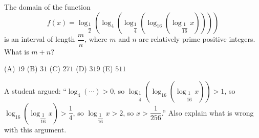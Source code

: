 The domain of the function
\[f(x)=\log_{\dfrac12}\left(\log_4\left(\log_{\dfrac14}\left(\log_{16}\left(\log_{\dfrac{1}{16}}x\right)\right)\right)\right)\]
is an interval of length $\dfrac mn$, where $m$ and $n$ are relatively prime positive integers. What is $m+n$?

(A) $19$ \qquad (B) $31$ \qquad (C) $271$ \qquad (D) $319$ \qquad (E) $511$

A student argued: ``$\log_4(\cdots)>0$, so $\log_{\dfrac14}\left(\log_{16}\left(\log_{\dfrac{1}{16}}x\right)\right)>1$, so $\log_{16}\left(\log_{\dfrac{1}{16}}x\right)>\dfrac14$, so $\log_{\dfrac{1}{16}}x>2$, so $x>\dfrac{1}{256}$.'' Also explain what is wrong with this argument.
